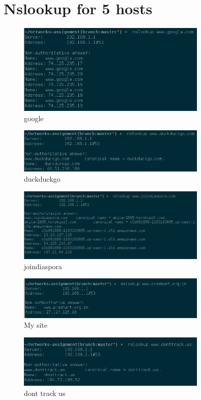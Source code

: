 \documentclass[20pt]{article}
\begin{document}
\section{Nslookup for 5 hosts}
\begin{figure}[ht!]
	\includegraphics[width=90mm]{1.png}
	\caption{google}
	\label{overflow}
\end{figure}
\begin{figure}[ht!]
	\includegraphics[width=90mm]{2.png}
	\caption{duckduckgo}
	\label{overflow}
\end{figure}
\begin{figure}[ht!]
	\includegraphics[width=90mm]{3.png}
	\caption{joindiaspora}
	\label{overflow}
\end{figure}
\begin{figure}[ht!]
	\includegraphics[width=90mm]{4.png}
	\caption{My site}
	\label{overflow}
\end{figure}

\begin{figure}[ht!]
	\includegraphics[width=90mm]{5.png}
	\caption{dont track us}
	\label{overflow}
\end{figure}
\end{document}
